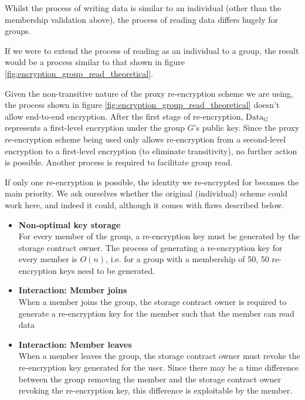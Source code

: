 Whilst the process of writing data is similar to an individual (other than the membership validation above), the process of reading data differs hugely for groups.

If we were to extend the process of reading as an individual to a group, the result would be a process similar to that shown in figure \ref{fig:encryption_group_read_theoretical}.



Given the non-transitive nature of the proxy re-encryption scheme we are using, the process shown in figure \ref{fig:encryption_group_read_theoretical} doesn't allow end-to-end encryption. After the first stage of re-encryption, $\text{Data}_{G}$ represents a first-level encryption under the group $G$'s public key. Since the proxy re-encryption scheme being used only allows re-encryption from a second-level encryption to a first-level encryption (to eliminate transitivity), no further action is possible. Another process is required to facilitate group read.

If only one re-encryption is possible, the identity we re-encrypted for becomes the main priority. We ask ourselves whether the original (individual) scheme could work here, and indeed it could, although it comes with flaws described below.

\begin{itemize}
  \item
  	\textbf{Non-optimal key storage} \\
    For every member of the group, a re-encryption key must be generated by the storage contract owner. The process of generating a re-encryption key for every member is $O(n)$, i.e. for a group with a membership of 50, 50 re-encryption keys need to be generated.
  \item
  	\textbf{Interaction: Member joins} \\
    When a member joins the group, the storage contract owner is required to generate a re-encryption key for the member such that the member can read data
  \item
  	\textbf{Interaction: Member leaves} \\
    When a member leaves the group, the storage contract owner must revoke the re-encryption key generated for the user. Since there may be a time difference between the group removing the member and the storage contract owner revoking the re-encryption key, this difference is exploitable by the member.
\end{itemize}

